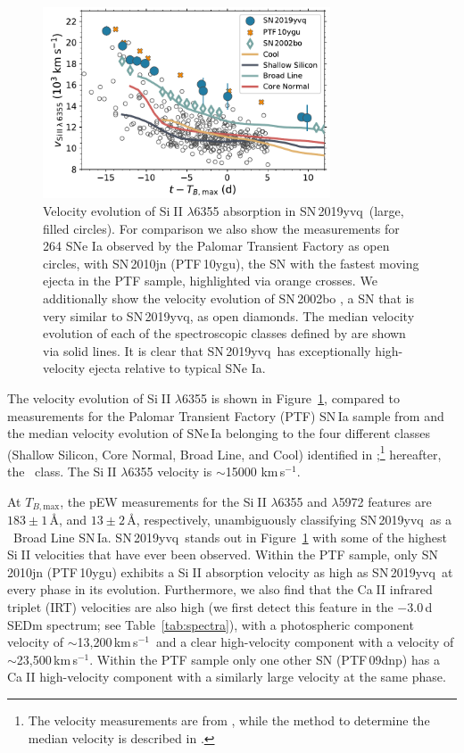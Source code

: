 \documentclass[twocolumn]{aastex63}
\def\ion#1#2{#1$\;${\footnotesize\rm{#2}}\relax}
\newcommand{\tbmax}{$T_{B,\mathrm{max}}$}
\newcommand{\kms}{km\,s$^{-1}$}
\newcommand{\sn}{SN\,2019yvq}
\begin{document}
\begin{figure}
    \centering
    \includegraphics[width=3.35in]{./figures/vel_evolution.pdf}
    \caption{Velocity evolution of \ion{Si}{II} $\lambda$6355 absorption in
    \sn\ (large, filled circles). For comparison we also show the measurements
    for 264 SNe Ia observed by the Palomar Transient Factory \citep[PTF; data
    from][]{Maguire14} as open circles, with SN\,2010jn (PTF\,10ygu), the SN
    with the fastest moving ejecta in the PTF sample, highlighted via orange
    crosses. We additionally show the velocity evolution of SN\,2002bo
    \citep[data from][]{Benetti04}, a SN that is very similar to \sn, as open
    diamonds. The median velocity evolution of each of the spectroscopic
    classes defined by \citet[][Shallow Silicon, Core Normal, Broad Line, and
    Cool]{Branch06} are shown via solid lines. It is clear that \sn\ has
    exceptionally high-velocity ejecta relative to typical SNe Ia.}
    \label{fig:vel_evo}
\end{figure}

The velocity evolution of \ion{Si}{II} $\lambda$6355 is shown in
Figure~\ref{fig:vel_evo}, compared to measurements for the Palomar Transient
Factory (PTF) SN\,Ia sample from \citet{Maguire14} and the median velocity
evolution of SNe\,Ia belonging to the four different classes (Shallow
Silicon, Core Normal, Broad Line, and Cool) identified in
\citet{Branch06};\footnote{The velocity measurements are from
\citet{Blondin12}, while the method to determine the median velocity is
described in \citet{Miller18}.} hereafter, the \citeauthor{Branch06}~class.
The \ion{Si}{II} $\lambda$6355 velocity is $\sim$15000 \kms.

At \tbmax, the pEW measurements for the \ion{Si}{II} $\lambda$6355 and
$\lambda$5972 features are $183\pm1$\,\AA, and $13\pm2$\,\AA, respectively,
unambiguously classifying \sn\ as a \citeauthor{Branch06}~Broad Line SN\,Ia.
\sn\ stands out in Figure~\ref{fig:vel_evo} with some of the highest
\ion{Si}{II} velocities that have ever been observed. Within the PTF sample,
only SN\,2010jn (PTF\,10ygu) exhibits a \ion{Si}{II} absorption velocity as
high as \sn\ at every phase in its evolution. Furthermore, we also find that
the \ion{Ca}{II} infrared triplet (IRT) velocities are also high (we first
detect this feature in the $-3.0$\,d SEDm spectrum; see
Table~\ref{tab:spectra}), with a photospheric component velocity of
$\sim$13,200\,\kms\ and a clear high-velocity component with a velocity of
$\sim$23,500\,\kms. Within the PTF sample only one other SN (PTF\,09dnp) has a
\ion{Ca}{II} high-velocity component with a similarly large velocity at the
same phase.
\end{document}
